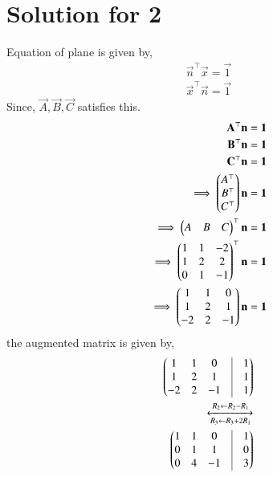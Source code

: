 \documentclass[A4,10pt,twocolumn]{IEEEtran}
\begin{document}
\section{Solution for 2}
Equation of plane is given by,
\begin{align}
\vec{n}^\top \vec{x} =\vec{1}\\
\vec{x}^\top \vec{n}=\vec{1}
\end{align}
Since, $\vec{A}, \vec{B}, \vec{C}$ satisfies this.
\begin{align}
\mathbf{A}^\top \mathbf{n}=\mathbf{1}\\
  \mathbf{B}^\top \mathbf{n}=\mathbf{1}\\
 \mathbf{C}^\top \mathbf{n}=\mathbf{1}\\
\implies \begin{pmatrix}A^\top\\B^\top\\C^\top\end{pmatrix}  \mathbf{n} = \mathbf{1}\\
\implies \begin{pmatrix}A&B&C\end{pmatrix}^\top\mathbf{n}=\mathbf{1}\\
\implies \begin{pmatrix}1&1&-2\\1&2&2\\0&1&-1\end{pmatrix}^\top \mathbf{n}=\mathbf{1}\\
\implies \begin{pmatrix}1&1&0 \\ 1&2&1 \\ -2&2&-1\end{pmatrix} \mathbf{n}=\mathbf{1}
\end{align}
the augmented matrix is given by,
\begin{align}
\myvec{1&1&0&\vrule&1\\1&2&1&\vrule&1\\-2&2&-1&\vrule&1}\\
\xleftrightarrow[R_3 \leftarrow R_3 + 2R_1]{R_2 \leftarrow R_2 - R_1}\\
\myvec{1&1&0&\vrule&1\\0&1&1&\vrule&0\\0&4&-1&\vrule&3}
\end{align}
\end{document}
